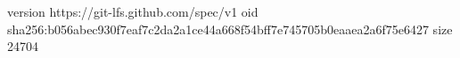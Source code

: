 version https://git-lfs.github.com/spec/v1
oid sha256:b056abec930f7eaf7c2da2a1ce44a668f54bff7e745705b0eaaea2a6f75e6427
size 24704
